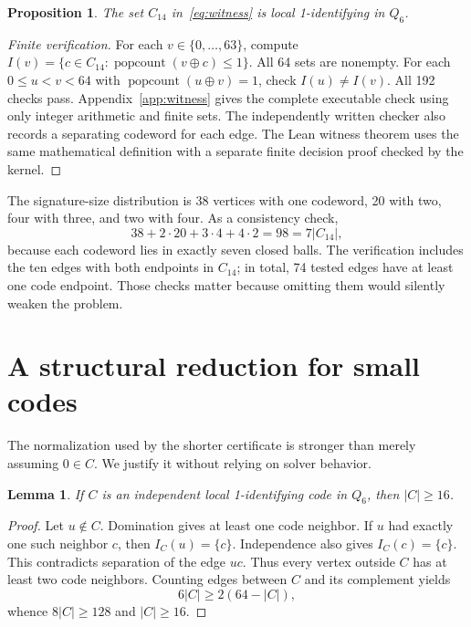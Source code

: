 \documentclass[11pt]{article}
\newtheorem{lemma}[theorem]{Lemma}
\newtheorem{proposition}[theorem]{Proposition}
\newcommand{\code}{C_{14}}
\begin{document}
\begin{proposition}\label{prop:upper}
The set $\code$ in~\eqref{eq:witness} is local 1-identifying in $Q_6$.
\end{proposition}
\begin{proof}[Finite verification]
For each $v\in\{0,\ldots,63\}$, compute $I(v)=\{c\in\code:\operatorname{popcount}(v\oplus c)\leq1\}$. All 64 sets are nonempty. For each $0\leq u<v<64$ with $\operatorname{popcount}(u\oplus v)=1$, check $I(u)\ne I(v)$. All 192 checks pass. Appendix~\ref{app:witness} gives the complete executable check using only integer arithmetic and finite sets. The independently written checker also records a separating codeword for each edge. The Lean witness theorem uses the same mathematical definition with a separate finite decision proof checked by the kernel.
\end{proof}
The signature-size distribution is 38 vertices with one codeword, 20 with two, four with three, and two with four. As a consistency check,
\[
 38+2\cdot20+3\cdot4+4\cdot2=98=7\lvert\code\rvert,
\]
because each codeword lies in exactly seven closed balls. The verification includes the ten edges with both endpoints in $\code$; in total, 74 tested edges have at least one code endpoint. Those checks matter because omitting them would silently weaken the problem.

\section{A structural reduction for small codes}\label{sec:normal}
The normalization used by the shorter certificate is stronger than merely assuming $0\in C$. We justify it without relying on solver behavior.
\begin{lemma}\label{lem:independent}
If $C$ is an independent local 1-identifying code in $Q_6$, then $|C|\geq16$.
\end{lemma}
\begin{proof}
Let $u\notin C$. Domination gives at least one code neighbor. If $u$ had exactly one such neighbor $c$, then $I_C(u)=\{c\}$. Independence also gives $I_C(c)=\{c\}$. This contradicts separation of the edge $uc$. Thus every vertex outside $C$ has at least two code neighbors. Counting edges between $C$ and its complement yields
\[
 6|C|\geq2(64-|C|),
\]
whence $8|C|\geq128$ and $|C|\geq16$.
\end{proof}
\end{document}
